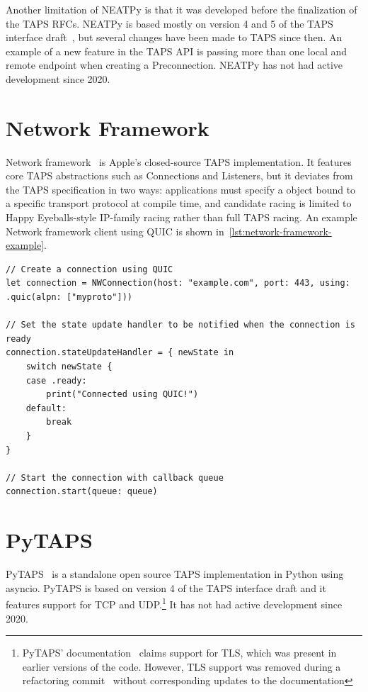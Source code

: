 Another limitation of NEATPy is that it was developed before the finalization of
the TAPS RFCs. NEATPy is based mostly on
version 4 and 5 of the TAPS interface draft~\cite[p.~109]{gundersenNEATPyStandardsConformantProtocolIndependent2020},
but several changes have been made to TAPS since then.
An example of a new feature in the TAPS API is passing more than one local and remote
endpoint when creating a Preconnection.
NEATPy has not had active development since 2020.

\section{Network Framework}
Network framework~\cite{networkFramework} is Apple's closed-source TAPS 
implementation. It features core TAPS abstractions such as Connections and 
Listeners, but it deviates from the TAPS specification in two ways: 
applications must specify a  object bound to a specific 
transport protocol at compile time, and candidate racing is limited to 
Happy Eyeballs-style IP-family racing rather than full TAPS racing. 
An example Network framework client using QUIC is shown in~\cref{lst:network-framework-example}.

\begin{listing}[htbp]
\begin{verbatim}
// Create a connection using QUIC
let connection = NWConnection(host: "example.com", port: 443, using: .quic(alpn: ["myproto"]))

// Set the state update handler to be notified when the connection is ready
connection.stateUpdateHandler = { newState in
    switch newState {
    case .ready:
        print("Connected using QUIC!")
    default:
        break
    }
}

// Start the connection with callback queue
connection.start(queue: queue)
\end{verbatim}
\caption[Network framework QUIC client]{Network framework example code of opening a QUIC connection~\cite{WWDC2021_10094}.}
\label{lst:network-framework-example}
\end{listing}

\section{PyTAPS}
PyTAPS~\cite{frankePythonasynciotaps2025} 
is a standalone open source TAPS implementation
in Python using asyncio. PyTAPS is based on version 4 of the TAPS
interface draft and it features support for TCP and UDP.\footnote{
PyTAPS' documentation~\cite{pytaps_docs} claims support for TLS,
which was present in earlier versions of the code.
However, TLS support was removed during a refactoring
commit~\cite{pytaps_tls_refactor} without corresponding updates
to the documentation} It has not had active
development since 2020.

